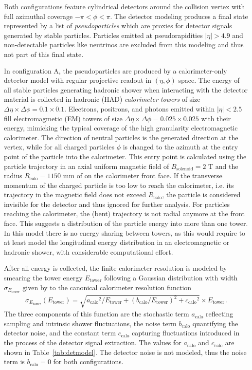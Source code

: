 \documentclass[11pt,letterpaper]{article}
\newcommand{\etower}{\ensuremath{E_{\text{tower}}}}
\newcommand{\acalo}{\ensuremath{a_{\text{calo}}}}
\newcommand{\bcalo}{\ensuremath{b_{\text{calo}}}}
\newcommand{\ccalo}{\ensuremath{c_{\text{calo}}}}
\begin{document}
Both configurations feature cylindrical detectors around the collision vertex with full azimuthal coverage $-\pi < \phi < \pi$.
The detector modeling produces a final state represented by a list of \emph{pseudoparticles} which are proxies for detector signals generated by stable particles.
Particles emitted at pseudorapidities $|\eta| > 4.9$ and non-detectable particles like neutrinos are excluded from this modeling and thus not part of this final state. 

In configuration A, the pseudoparticles are produced by a calorimeter-only detector model with regular projective readout in $(\eta,\phi)$ space. 
The energy of all stable particles generating hadronic shower when interacting with the detector material is collected 
in hadronic (HAD) \emph{calorimeter towers} of size $\Delta\eta\times\Delta\phi = 0.1\times0.1$. 
Electrons, positrons, and photons emitted within $|\eta| < 2.5$ fill electromagmetic (EM) towers of size $\Delta\eta\times\Delta\phi = 0.025\times0.025$ with their energy, mimicking the typical
coverage of the high granularity electromagnetic calorimeter. 
The direction of neutral particles is the generated direction at the vertex, while for all charged particles $\phi$ is changed to the azimuth at the entry point of the particle
into the calorimeter. 
This entry point is calculated using the particle trajectory in an axial uniform magnetic field of $B_{\text{solenoid}} = 2$%
 T and the radius $R_{\text{calo}} = 1150$ mm of
on the calorimeter front face.
If the transverse momentum of the charged particle  is too low to reach the calorimeter, i.e. its trajectory in the magnetic field does not exceed $R_{\text{calo}}$, 
the particle is considered invisible for the detector and thus ignored for further analysis.   
For particles reaching the calorimeter, the (bent) trajectory is not radial anymore at the front face.
This suggests a distribution of the particle energy into more than one tower.
In this model there is no energy sharing between towers, as this would require to at least model the longitudinal energy distribution in an electromagnetic or hadronic shower, with considerable computational effort.

After all energy is collected, the finite calorimeter resolution is modeled by smearing the tower energy \etower{} following a Gaussian distribution with width 
$\sigma_{\etower}$ given by to the canonical calorimeter resolution function
\begin{align}
  \sigma_{\etower}(\etower) = \sqrt{\acalo^{2}/\etower + (\bcalo/\etower)^{2} + \ccalo^{2}} \times \etower\,.
  \label{eq:caloreso}
\end{align}
The three components of this function are the stochastic term \acalo{} reflecting sampling and intrinsic shower fluctuations, the noise term \bcalo{} quantifying the detector noise, 
and the constant term \ccalo{} capturing fluctuations introduced in the process of the detector signal extraction.  
The values for \acalo{} and \ccalo{} are shown in Table~\ref{tab:detmodel}. 
The detector noise is not modeled, thus the noise term is $\bcalo=0$ for both configurations.
\end{document}
